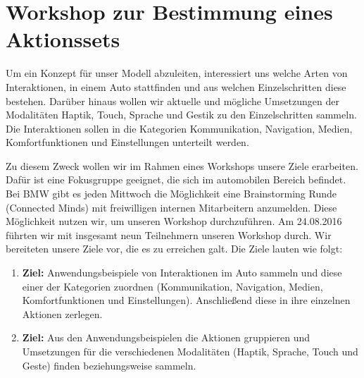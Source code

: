 \chapter[Workshop Connected Minds]{Workshop zur Bestimmung eines Aktionssets}\label{cha:Workshop}
Um ein Konzept für unser Modell abzuleiten, interessiert uns welche Arten von Interaktionen, in einem Auto stattfinden und aus welchen Einzelschritten diese bestehen. Darüber hinaus wollen wir aktuelle und mögliche Umsetzungen der Modalitäten Haptik, Touch, Sprache und Gestik zu den Einzelschritten sammeln. Die Interaktionen sollen in die Kategorien Kommunikation, Navigation, Medien, Komfortfunktionen und Einstellungen unterteilt werden.

Zu diesem Zweck wollen wir im Rahmen eines Workshops unsere Ziele erarbeiten. Dafür ist eine Fokusgruppe geeignet, die sich im automobilen Bereich befindet.   
Bei BMW gibt es jeden Mittwoch die Möglichkeit eine Brainstorming Runde (Connected Minds) mit freiwilligen internen Mitarbeitern anzumelden. Diese Möglichkeit nutzen wir, um unseren Workshop durchzuführen.
Am 24.08.2016 führten wir mit insgesamt neun Teilnehmern unseren Workshop durch. 
Wir bereiteten unsere Ziele vor, die es zu erreichen galt. Die Ziele lauten wie folgt:  
\begin{enumerate}
	\item \textbf{Ziel:} Anwendungsbeispiele von Interaktionen im Auto sammeln und diese einer der Kategorien zuordnen (Kommunikation, Navigation, Medien, Komfortfunktionen und Einstellungen). Anschließend diese in ihre einzelnen Aktionen zerlegen. 
	\item \textbf{Ziel:} Aus den Anwendungsbeispielen die Aktionen gruppieren und Umsetzungen für die verschiedenen Modalitäten (Haptik, Sprache, Touch und Geste) finden beziehungsweise sammeln.
\end{enumerate}
